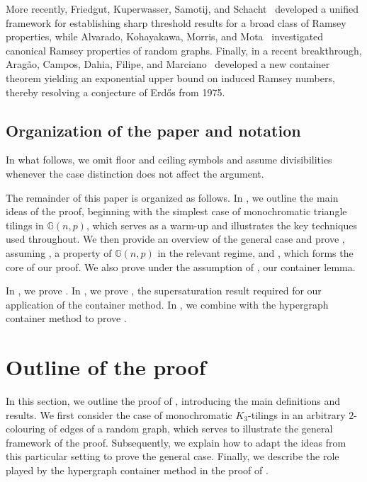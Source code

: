 \documentclass[a4paper,reqno,11pt]{amsart}
\theoremstyle{definition}
\theoremstyle{remark}
\begin{document}
More recently, Friedgut, Kuperwasser, Samotij, and Schacht~\cite{FKSS} developed a unified framework for establishing sharp threshold results for a broad class of Ramsey properties, while Alvarado, Kohayakawa, Morris, and Mota~\cite{AKMM,AKMM2} investigated canonical Ramsey properties of random graphs. Finally, in a recent breakthrough, Aragão, Campos, Dahia, Filipe, and Marciano~\cite{ACDFM} developed a new container theorem yielding an exponential upper bound on induced Ramsey numbers, thereby resolving a conjecture of Erd\H{o}s from 1975.

\subsection{Organization of the paper and notation} 

In what follows, we omit floor and ceiling symbols and assume divisibilities whenever the case distinction does not affect the argument.

The remainder of this paper is organized as follows. In , we outline the main ideas of the proof, beginning with the simplest case of monochromatic triangle tilings in $\mathbb{G}(n,p)$, which serves as a warm-up and illustrates the key techniques used throughout. We then provide an overview of the general case and prove , assuming , a property of $\mathbb{G}(n,p)$ in the relevant regime, and , which forms the core of our proof. We also prove  under the assumption of , our container lemma.

In , we prove . In , we prove , the supersaturation result required for our application of the container method. In , we combine  with the hypergraph container method to prove .

\section{Outline of the proof}\label{sec:2}

In this section, we outline the proof of , introducing the main definitions and results. We first consider the case of monochromatic $K_3$-tilings in an arbitrary $2$-colouring of edges of a random graph, which serves to illustrate the general framework of the proof. Subsequently, we explain how to adapt the ideas from this particular setting to prove the general case. Finally, we describe the role played by the hypergraph container method in the proof of .
\end{document}
